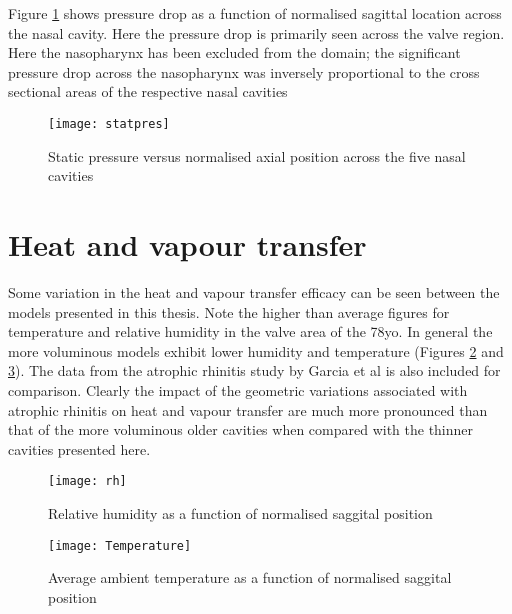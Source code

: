 Figure \ref{fig:stpr} shows pressure drop as a function of normalised sagittal location across the nasal cavity. Here the pressure drop is primarily seen across the valve region. Here the nasopharynx has been excluded from the domain; the significant pressure drop across the nasopharynx was inversely proportional to the cross sectional areas of the respective nasal cavities


\begin{figure} 
  \texttt{[image: statpres]}
  \caption{Static pressure versus normalised axial position across the five nasal cavities}
  \label{fig:stpr}
\end{figure}



\section{Heat and vapour transfer}

Some variation in the heat and vapour transfer efficacy can be seen between the models presented in this thesis. Note the higher than average figures for temperature and relative humidity in the valve area of the 78yo. In general the more voluminous models exhibit lower humidity and temperature (Figures \ref{fig:h2o} and \ref{fig:Temp}). The data from the atrophic rhinitis study by Garcia et al \cite{Garcia2007} is also included for comparison. Clearly the impact of the geometric variations associated with atrophic rhinitis on heat and vapour transfer are much more pronounced than that of the more voluminous older cavities when compared with the thinner cavities presented here. 

\begin{figure} 
  \texttt{[image: rh]}
  \caption{Relative humidity as a function of normalised saggital position}
  \label{fig:h2o}
\end{figure}


\begin{figure} 
  \texttt{[image: Temperature]}
  \caption{Average ambient temperature as a function of normalised saggital position}
  \label{fig:Temp}
\end{figure}
